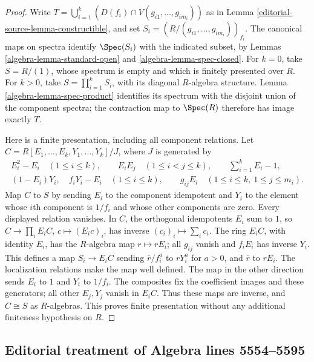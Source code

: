 \begin{proof}
Write
$T=\bigcup_{i=1}^k(D(f_i)\cap V(g_{i1},\ldots,g_{im_i}))$
as in Lemma \ref{editorial-source-lemma-constructible}, and set
$S_i=(R/(g_{i1},\ldots,g_{im_i}))_{f_i}$.
The canonical maps on spectra identify $\Spec(S_i)$ with the indicated
subset, by Lemmas \ref{algebra-lemma-standard-open} and \ref{algebra-lemma-spec-closed}.
For $k=0$, take $S=R/(1)$, whose spectrum is empty and which is finitely
presented over $R$. For $k>0$, take $S=\prod_{i=1}^kS_i$, with its
diagonal $R$-algebra structure. Lemma \ref{algebra-lemma-spec-product} identifies
its spectrum with the disjoint union of the component spectra; the
contraction map to $\Spec(R)$ therefore has image exactly $T$.

\medskip\noindent
Here is a finite presentation, including all component relations. Let
$C=R[E_1,\ldots,E_k,Y_1,\ldots,Y_k]/J$, where $J$ is generated by
$$
\begin{gathered}
E_i^2-E_i\quad(1\leq i\leq k),\qquad
E_iE_j\quad(1\leq i<j\leq k),\qquad
\sum_{i=1}^kE_i-1,\\
(1-E_i)Y_i,\quad f_iY_i-E_i\quad(1\leq i\leq k),\qquad
g_{ij}E_i\quad(1\leq i\leq k,\ 1\leq j\leq m_i).
\end{gathered}
$$
Map $C$ to $S$ by sending $E_i$ to the component idempotent and $Y_i$
to the element whose $i$th component is $1/f_i$ and whose other
components are zero. Every displayed relation vanishes. In $C$, the
orthogonal idempotents $E_i$ sum to $1$, so
$C\longrightarrow\prod_iE_iC$, $c\longmapsto(E_ic)_i$, has inverse
$(c_i)_i\longmapsto\sum_i c_i$. The ring $E_iC$, with identity $E_i$,
has the $R$-algebra map $r\mapsto rE_i$; all $g_{ij}$ vanish and
$f_iE_i$ has inverse $Y_i$. This defines a map $S_i\to E_iC$ sending
$\bar r/f_i^a$ to $rY_i^a$ for $a>0$, and $\bar r$ to $rE_i$.
The localization relations make the map well defined. The map in the
other direction sends $E_i$ to $1$ and $Y_i$ to $1/f_i$.
The composites fix the coefficient images and these generators; all
other $E_j,Y_j$ vanish in $E_iC$. Thus these maps are inverse, and
$C\cong S$ as $R$-algebras. This proves finite presentation without
any additional finiteness hypothesis on $R$.
\end{proof}


\subsection{Editorial treatment of Algebra lines 5554--5595}

\hypertarget{algebra-context-036}{}


